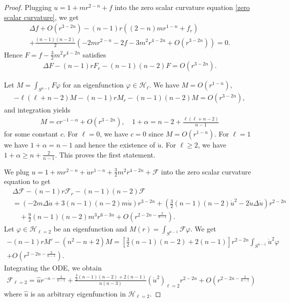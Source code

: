 \documentclass[12pt,twoside]{article}
\theoremstyle{plain}
\theoremstyle{definition}
\theoremstyle{remark}
\newcommand{\vphi}{\varphi}
\newcommand{\lt}{\left}
\newcommand{\rt}{\right}
\numberwithin{equation}{section}
\begin{document}
\begin{proof}
Plugging $u = 1 + m r^{2-n} + f$ into the zero scalar curvature equation \eqref{zero scalar curvature}, we get
\begin{align*}
\Delta f + O(r^{3-2n}) - (n-1)r \lt( (2-n)mr^{1-n} + f_r \rt) \\
+ \frac{(n-1)(n-2)}{2} \lt( -2m r^{2-n} -2f - 3m^2 r^{4-2n} + O(r^{3-2n}) \rt) =0.
\end{align*}
Hence $F = f - \frac{3}{2}m^2 r^{4-2n} $ satisfies
\begin{align*}
\Delta F -(n-1)r F_r - (n-1)(n-2)F = O(r^{3-2n}).
\end{align*}

Let $M = \int_{S^{n-1}} F \vphi$ for an eigenfunction $\vphi \in \mathcal{H}_\ell$. We have $M = O(r^{1-n})$,  
\begin{align*}
-\ell (\ell + n-2) M - (n-1)r M_r - (n-1)(n-2) M = O(r^{3-2n}),
\end{align*}
and integration yields
\begin{align*}
M = c r^{-1-\alpha} + O(r^{3-2n}), \quad 1 + \alpha = n-2 + \frac{\ell(\ell+n-2)}{n-1}
\end{align*}
for some constant $c$. For $\ell=0$, we have $c=0$ since $M = O(r^{1-n})$. For $\ell=1$ we have $1+\alpha = n-1$ and hence the existence of $\dot u$. For $\ell \ge 2$, we have $1 + \alpha \ge n+ \frac{2}{n-1}$. This proves the first statement.

We plug $u = 1 + m r^{2-n} + \dot u r^{1-n} + \frac{3}{2}m^2 r^{4-2n} + \mathcal{F}$ into the zero scalar curvature equation to get
\begin{align*}
&\Delta\mathcal{F} -(n-1)r \mathcal{F}_r - (n-1)(n-2)\mathcal{F}\\
&= \lt( -2m\Delta\dot u + 3(n-1)(n-2)m\dot u \rt)r^{3-2n} + \lt( \frac{3}{2}(n-1)(n-2) \dot u^2 - 2\dot u \Delta\dot u \rt) r^{2-2n} \\
&\quad + \frac{9}{2}(n-1)(n-2) m^3 r^{6-3n} + O(r^{2-2n - \frac{2}{n-1}}).
\end{align*}
Let $\vphi \in \mathcal{H}_{\ell=2}$ be an eigenfunction and $M(r) = \int_{S^{n-1}} \mathcal{F} \vphi$. We get 
\begin{align*}
-(n-1) r M' - (n^2-n+2)M = \lt[ \frac{3}{2}(n-1)(n-2) + 2(n-1) \rt] r^{2-2n}\int_{S^{n-1}} \dot u^2 \vphi \\ + O(r^{2-2n - \frac{2}{n-1}}).
\end{align*}
Integrating the ODE, we obtain
\begin{align*}
\mathcal{F}_{\ell=2} = \hat u r^{-n - \frac{2}{n-1}} + \frac{\frac{3}{2}(n-1)(n-2)+2(n-1)}{n(n-3)}\lt( \dot u^2\rt)_{\ell=2} r^{2-2n} + O(r^{2-2n - \frac{2}{n-1}}) 
\end{align*}
where $\hat u$ is an arbitrary eigenfunction in $\mathcal{H}_{\ell=2}$. 
\end{proof}
\end{document}
